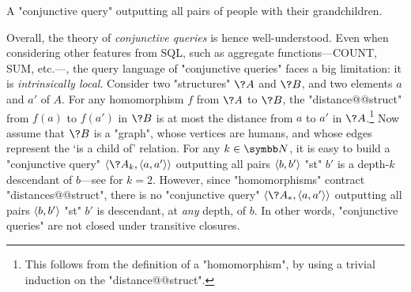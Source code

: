 \begin{marginfigure}
	\centering
	\caption{
		\AP\label{fig:CQ-grandchild}
		A "conjunctive query" outputting all pairs of people with their grandchildren.
	}
\end{marginfigure}
Overall, the theory of \emph{conjunctive queries} is hence well-understood.
Even when considering other features from SQL, such as aggregate functions---\textsf{COUNT}, \textsf{SUM}, etc.---, the query language of "conjunctive queries" faces a big limitation:
it is \emph{intrinsically local}.
Consider two "structures" $\?A$ and $\?B$, and two elements $a$ and $a'$ of $A$.
For any homomorphism $f$ from $\?A$ to $\?B$, the "distance@@struct" from $f(a)$ to $f(a')$
in $\?B$ is at most the distance from $a$ to $a'$ in $\?A$.\footnote{This follows from
the definition of a "homomorphism", by using a trivial induction on the "distance@@struct".}
Now assume that $\?B$ is a "graph", whose vertices are humans,
and whose edges represent the `is a child of' relation.
For any $k\in\N$, it is easy to build a "conjunctive query" $\tup{\?A_k, \tup{a, a'}}$
outputting all pairs $\langle b,b'\rangle$ "st" $b'$ is a depth-$k$ descendant of $b$---see
 for $k=2$.
However, since "homomorphisms" contract "distances@@struct", there is no
"conjunctive query" $\tup{\?A_*, \tup{a, a'}}$ outputting all pairs $\langle b,b'\rangle$
"st" $b'$ is descendant, at \emph{any} depth, of $b$.
In other words, "conjunctive queries" are not closed under transitive closures.

